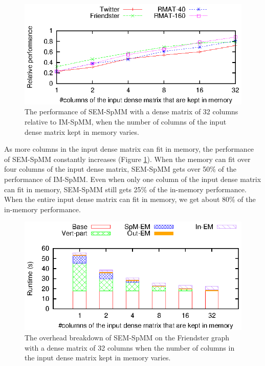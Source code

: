 \begin{figure}
	\begin{center}
		\footnotesize
		\includegraphics[scale=1]{SpMM_figs/spmm-32cols.eps}
		\caption{The performance of SEM-SpMM with a dense matrix of 32 columns
			relative to IM-SpMM, when the number of columns of the input dense
		matrix kept in memory varies.}
		\label{perf:spmm32}
	\end{center}
\end{figure}

As more columns in the input dense matrix can fit in memory, the performance
of SEM-SpMM constantly increases (Figure \ref{perf:spmm32}). When the memory
can fit over four columns of the input dense matrix, SEM-SpMM gets over 50\%
of the performance of IM-SpMM. Even when only one column of the input dense
matrix can fit in memory, SEM-SpMM still gets 25\% of the in-memory performance.
When the entire input dense matrix can fit in memory, we get about 80\% of
the in-memory performance.

\begin{figure}
	\begin{center}
		\footnotesize
		\includegraphics[scale=1]{SpMM_figs/spmm-32cols-overhead.eps}
		\caption{The overhead breakdown of SEM-SpMM on the Friendster
			graph with a dense matrix of 32 columns when the number
		of columns in the input dense matrix kept in memory varies. }
		\label{perf:spmm32_over}
	\end{center}
\end{figure}

